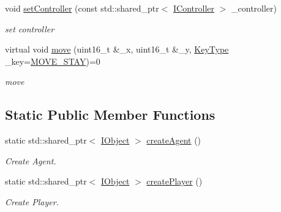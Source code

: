 \begin{DoxyCompactItemize}
void \hyperlink{class_i_object_a1824f86dd86c51b0641799d81a530599}{set\+Controller} (const std\+::shared\+\_\+ptr$<$ \hyperlink{class_i_controller}{I\+Controller} $>$ \+\_\+controller)
\begin{DoxyCompactList}\small\item\em set controller \end{DoxyCompactList}\item 
virtual void \hyperlink{class_i_object_a1bbc27b2cecbda3cf57fd6ed0099d98a}{move} (uint16\+\_\+t \&\+\_\+x, uint16\+\_\+t \&\+\_\+y, \hyperlink{_i_key_type_8h_aab0feaba617470cb4aa830dc5935238c}{Key\+Type} \+\_\+key=\hyperlink{_object_agent_8h_a00ec4eba48da32d6cbdf827185fd3d34a2a255050085b4deedc187c2d8be54d5a}{M\+O\+V\+E\+\_\+\+S\+T\+A\+Y})=0
\begin{DoxyCompactList}\small\item\em move \end{DoxyCompactList}\end{DoxyCompactItemize}
\subsection*{Static Public Member Functions}
\begin{DoxyCompactItemize}
\item 
static std\+::shared\+\_\+ptr$<$ \hyperlink{class_i_object}{I\+Object} $>$ \hyperlink{class_i_object_a21d3108e01e2de267cb6166f8e60a930}{create\+Agent} ()
\begin{DoxyCompactList}\small\item\em Create Agent. \end{DoxyCompactList}\item 
static std\+::shared\+\_\+ptr$<$ \hyperlink{class_i_object}{I\+Object} $>$ \hyperlink{class_i_object_a3ced4ca7a72fe317af3367da52a3fa16}{create\+Player} ()
\begin{DoxyCompactList}\small\item\em Create Player. \end{DoxyCompactList}\end{DoxyCompactItemize}
